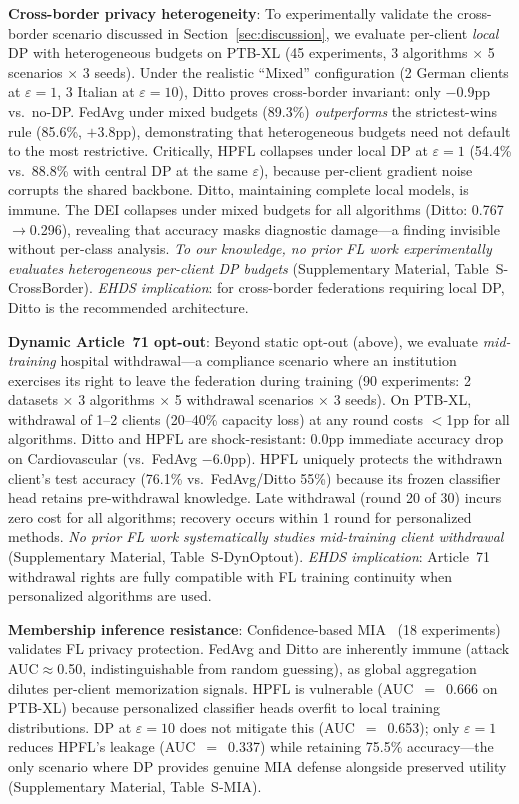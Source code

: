 \documentclass[conference,a4paper]{IEEEtran}
\begin{document}
\textbf{Cross-border privacy heterogeneity}: To experimentally validate the cross-border scenario discussed in Section~\ref{sec:discussion}, we evaluate per-client \textit{local} DP with heterogeneous budgets on PTB-XL (45 experiments, 3 algorithms $\times$ 5 scenarios $\times$ 3 seeds). Under the realistic ``Mixed'' configuration (2 German clients at $\varepsilon{=}1$, 3 Italian at $\varepsilon{=}10$), Ditto proves cross-border invariant: only $-$0.9pp vs.\ no-DP. FedAvg under mixed budgets (89.3\%) \textit{outperforms} the strictest-wins rule (85.6\%, $+$3.8pp), demonstrating that heterogeneous budgets need not default to the most restrictive. Critically, HPFL collapses under local DP at $\varepsilon{=}1$ (54.4\% vs.\ 88.8\% with central DP at the same $\varepsilon$), because per-client gradient noise corrupts the shared backbone. Ditto, maintaining complete local models, is immune. The DEI collapses under mixed budgets for all algorithms (Ditto: 0.767$\to$0.296), revealing that accuracy masks diagnostic damage---a finding invisible without per-class analysis. \textit{To our knowledge, no prior FL work experimentally evaluates heterogeneous per-client DP budgets} (Supplementary Material, Table~S-CrossBorder). \textit{EHDS implication}: for cross-border federations requiring local DP, Ditto is the recommended architecture.

\textbf{Dynamic Article~71 opt-out}: Beyond static opt-out (above), we evaluate \textit{mid-training} hospital withdrawal---a compliance scenario where an institution exercises its right to leave the federation during training (90 experiments: 2 datasets $\times$ 3 algorithms $\times$ 5 withdrawal scenarios $\times$ 3 seeds). On PTB-XL, withdrawal of 1--2 clients (20--40\% capacity loss) at any round costs $<$1pp for all algorithms. Ditto and HPFL are shock-resistant: 0.0pp immediate accuracy drop on Cardiovascular (vs.\ FedAvg $-$6.0pp). HPFL uniquely protects the withdrawn client's test accuracy (76.1\% vs.\ FedAvg/Ditto 55\%) because its frozen classifier head retains pre-withdrawal knowledge. Late withdrawal (round 20 of 30) incurs zero cost for all algorithms; recovery occurs within 1 round for personalized methods. \textit{No prior FL work systematically studies mid-training client withdrawal} (Supplementary Material, Table~S-DynOptout). \textit{EHDS implication}: Article~71 withdrawal rights are fully compatible with FL training continuity when personalized algorithms are used.

\textbf{Membership inference resistance}: Confidence-based MIA~\cite{shokri2017membership} (18 experiments) validates FL privacy protection. FedAvg and Ditto are inherently immune (attack AUC$\approx$0.50, indistinguishable from random guessing), as global aggregation dilutes per-client memorization signals. HPFL is vulnerable (AUC~$=$~0.666 on PTB-XL) because personalized classifier heads overfit to local training distributions. DP at $\varepsilon{=}10$ does not mitigate this (AUC~$=$~0.653); only $\varepsilon{=}1$ reduces HPFL's leakage (AUC~$=$~0.337) while retaining 75.5\% accuracy---the only scenario where DP provides genuine MIA defense alongside preserved utility (Supplementary Material, Table~S-MIA).
\end{document}
